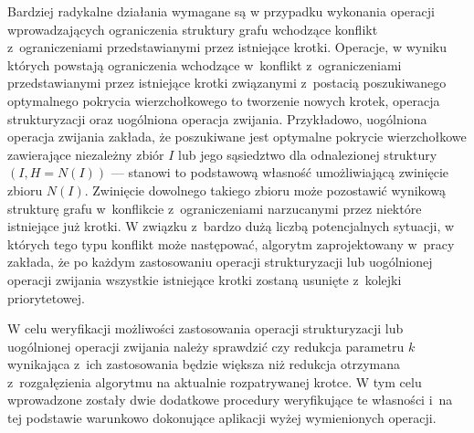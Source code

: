 \par{
  Bardziej radykalne działania wymagane są w przypadku wykonania operacji wprowadzających ograniczenia struktury grafu wchodzące konflikt z~ograniczeniami przedstawianymi przez istniejące krotki.
  Operacje, w wyniku których powstają ograniczenia wchodzące w~konflikt z~ograniczeniami przedstawianymi przez istniejące krotki związanymi z~postacią poszukiwanego optymalnego pokrycia wierzchołkowego to tworzenie nowych krotek, operacja strukturyzacji oraz uogólniona operacja zwijania.
  Przykładowo, uogólniona operacja zwijania zakłada, że poszukiwane jest optymalne pokrycie wierzchołkowe zawierające niezależny zbiór $I$ lub jego sąsiedztwo dla odnalezionej struktury $(I, H=N(I))$ --- stanowi to podstawową własność umożliwiającą zwinięcie zbioru $N(I)$.
  Zwinięcie dowolnego takiego zbioru może pozostawić wynikową strukturę grafu w~konflikcie z~ograniczeniami narzucanymi przez niektóre istniejące już krotki.
  W związku z~bardzo dużą liczbą potencjalnych sytuacji, w których tego typu konflikt może następować, algorytm zaprojektowany w~pracy~\cite{ImprovedBounds10} zakłada, że po każdym zastosowaniu operacji strukturyzacji lub uogólnionej operacji zwijania wszystkie istniejące krotki zostaną usunięte z~kolejki priorytetowej.

  W celu weryfikacji możliwości zastosowania operacji strukturyzacji lub uogólnionej operacji zwijania należy sprawdzić czy redukcja parametru $k$ wynikająca z~ich zastosowania będzie większa niż redukcja otrzymana z~rozgałęzienia algorytmu na aktualnie rozpatrywanej krotce.
  W tym celu wprowadzone zostały dwie dodatkowe procedury weryfikujące te własności i~na tej podstawie warunkowo dokonujące aplikacji wyżej wymienionych operacji.
}

